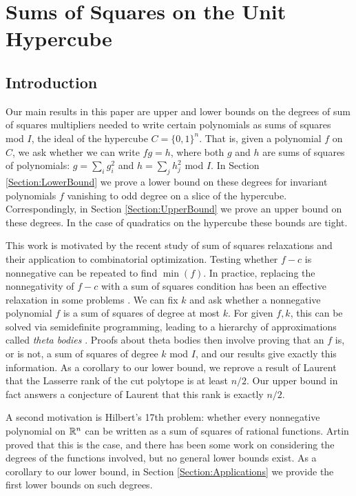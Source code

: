 
\chapter{Sums of Squares on the Unit Hypercube}
\label{chap:cube}

\section{Introduction}\label{Section:Introduction}

Our main results in this paper are upper and lower bounds on the degrees of sum of squares multipliers needed to write certain polynomials as sums of squares mod $I$, the ideal of the hypercube $C = \{0,1\}^n$. 
That is, given a polynomial $f$ on $C$, we ask whether we can write $fg=h$, where both $g$ and $h$ are sums of squares of polynomials: $g = \sum_i g_i^2$ and $h = \sum_j h_j^2$ mod $I$.
In Section \ref{Section:LowerBound} we prove a lower bound on these degrees for invariant polynomials $f$ vanishing to odd degree on a slice of the hypercube.
Correspondingly, in Section \ref{Section:UpperBound} we prove an upper bound on these degrees.
In the case of quadratics on the hypercube these bounds are tight.

This work is motivated by the recent study of sum of squares relaxations and their application to combinatorial optimization. 
Testing whether $f - c$ is nonnegative can be repeated to find $\min(f)$.
In practice, replacing the nonnegativity of $f-c$ with a sum of squares condition has been an effective relaxation in some problems \cite{gpt} \cite{sostools}. 
We can fix $k$ and ask whether a nonnegative polynomial $f$ is a sum of squares of degree at most $k$. 
For given $f,k$, this can be solved via semidefinite programming, leading to a hierarchy of approximations called {\em theta bodies} \cite{gpt}. 
Proofs about theta bodies then involve proving that an $f$ is, or is not, a sum of squares of degree $k$ mod $I$, and our results give exactly this information.
As a corollary to our lower bound, we reprove a result of Laurent \cite{moniquestuff} that the Lasserre rank of the cut polytope is at least $n/2$.
Our upper bound in fact answers a conjecture of Laurent that this rank is exactly $n/2$.

A second motivation is Hilbert's 17th problem: whether every nonnegative polynomial on $\mathbb{R}^n$ can be written as a sum of squares of rational functions.
Artin proved that this is the case, and there has been some work on considering the degrees of the functions involved, but no general lower bounds exist.
As a corollary to our lower bound, in Section \ref{Section:Applications} we provide the first lower bounds on such degrees.

